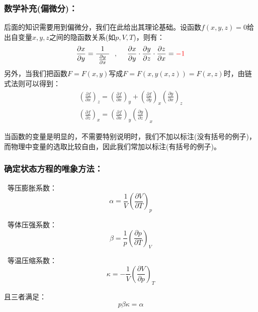 \documentclass[zihao=-4,UTF8]{report}
\begin{document}
\subsubsection{数学补充(偏微分)：}
后面的知识需要用到偏微分，我们在此给出其理论基础。设函数$f(x,y,z) = 0$给出自变量$x,y,z$之间的隐函数关系(如$p,V,T$)，则有：
\begin{align*}
    \frac{\partial x}{\partial y} = \frac{1}{\ \frac{\partial y}{\partial x} \ }\ \  ,\ \ \ \ 
    \frac{\partial x}{\partial y}\cdot \frac{\partial y}{\partial z}\cdot \frac{\partial z}{\partial x} = {\textcolor{red}{-1}}
\end{align*}
另外，当我们把函数$F = F(x,y)$写成$F = F(x,y(x,z)) = F(x,z)$时，由链式法则可以得到：
\begin{gather}
    \left(\frac{\partial f}{\partial x}\right)_z = \left(\frac{\partial f}{\partial x}\right)_y + \left(\frac{\partial f}{\partial y}\right)_x \left(\frac{\partial y}{\partial x}\right)_z \\
    \left(\frac{\partial f}{\partial z}\right)_x = \left(\frac{\partial f}{\partial x}\right)_y\left(\frac{\partial y}{\partial z}\right)_x
\end{gather}\par
{\color{gray}\small 当函数的变量是明显的，不需要特别说明时，我们不加以标注(没有括号的例子)，而物理中变量的选取比较自由，因此我们常加以标注(有括号的例子)。}
\subsubsection{确定状态方程的唯象方法：}
\ 等压膨胀系数：
\begin{equation}
    \alpha = \frac{1}{V} \left( \frac{\partial V}{\partial T}\right)_p
\end{equation}\par
{}\ 
等体压强系数：
\begin{equation}
    \beta = \frac{1}{p}\left( \frac{\partial p}{\partial T}\right)_V
\end{equation}\par
\ding{174}\ 等温压缩系数：
\begin{equation}
    \kappa  = -\frac{1}{V}\left(\frac{\partial V}{\partial p} \right)_T
\end{equation}\par
且三者满足：
\begin{equation}
    p\beta \kappa = \alpha
\end{equation}
\end{document}
